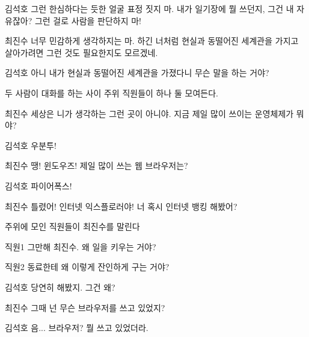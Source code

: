 \documentclass{screenplay}
\begin{document}
    \begin{dialogue}{김석호}
        그런 한심하다는 듯한 얼굴 표정 짓지 마. 내가 일기장에 뭘 쓰던지, 그건 내 자유잖아? 그런 걸로 사람을 판단하지 마!
    \end{dialogue}
    \begin{dialogue}{최진수}
        너무 민감하게 생각하지는 마. 하긴 너처럼 현실과 동떨어진 세계관을 가지고 살아가려면 그런 것도 필요한지도 모르겠네.
    \end{dialogue}
    \begin{dialogue}{김석호}
        아니 내가 현실과 동떨어진 세계관을 가졌다니 무슨 말을 하는 거야?
    \end{dialogue}
    두 사람이 대화를 하는 사이 주위 직원들이 하나 둘 모여든다.
    \begin{dialogue}{최진수}
        세상은 니가 생각하는 그런 곳이 아니야. 지금 제일 많이 쓰이는 운영체제가 뭐야?
    \end{dialogue}
    \begin{dialogue}{김석호}
        우분투!
    \end{dialogue}
    \begin{dialogue}{최진수}
        땡! 윈도우즈!
        제일 많이 쓰는 웹 브라우저는?
    \end{dialogue}
    \begin{dialogue}{김석호}
        파이어폭스!
    \end{dialogue}
    \begin{dialogue}{최진수}
        틀렸어! 인터넷 익스플로러야! 
        너 혹시 인터넷 뱅킹 해봤어?
    \end{dialogue}
    주위에 모인 직원들이 최진수를 말린다
    \begin{dialogue}{직원1}
        그만해 최진수. 왜 일을 키우는 거야?
    \end{dialogue}
    \begin{dialogue}{직원2}
        동료한테 왜 이렇게 잔인하게 구는 거야?
    \end{dialogue}
    \begin{dialogue}{김석호}
        당연히 해봤지. 그건 왜?
    \end{dialogue}
    \begin{dialogue}{최진수}
        그때 넌 무슨 브라우저를 쓰고 있었지?
    \end{dialogue}
    \begin{dialogue}{김석호}
        음... 브라우저? 뭘 쓰고 있었더라.
    \end{dialogue}
\end{document}
